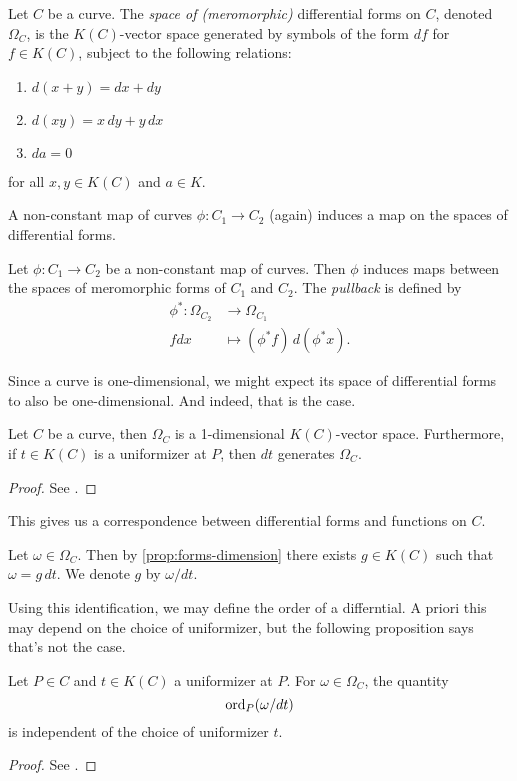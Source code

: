 \begin{definition}
	Let $C$ be a curve. 
	The \emph{space of (meromorphic)} differential forms on $C$, denoted
	$\Omega_C$, is the $K(C)$-vector space generated by symbols of the form
	$df$ for $f\in K(C)$, subject to the following relations:
	\begin{enumerate}[itemsep=0em]
		\item $d(x + y) = dx + dy$
		\item $d(xy) = x\,dy + y\,dx$
		\item $da = 0$
	\end{enumerate}
	for all $x, y \in K(C)$ and $a \in K$.
\end{definition}

A non-constant map of curves $\phi:C_1 \to C_2$ (again) induces a map
on the spaces of differential forms.

\begin{definition}
	Let $\phi: C_1 \to C_2$ be a non-constant map of curves. Then $\phi$ induces
	maps between the spaces of meromorphic forms of $C_1$ and $C_2$.
	The \emph{pullback} is defined by
	\begin{align*}
		\phi^*: \Omega_{C_2} &\to \Omega_{C_1}\\
		fdx &\mapsto (\phi^* f)\,d(\phi^* x).
	\end{align*}
\end{definition}

Since a curve is one-dimensional, we might expect its space of differential
forms to also be one-dimensional. And indeed, that is the case.

\begin{proposition}
	\label{prop:forms-dimension}
	Let $C$ be a curve, then $\Omega_C$ is a 1-dimensional $K(C)$-vector space.
	Furthermore, if $t \in K(C)$ is a uniformizer at $P$,
	then $dt$ generates $\Omega_C$.
\end{proposition}
\begin{proof}
	See \cite[II.1.4, II.4.2]{silverman}.
\end{proof}

This gives us a correspondence between differential forms and functions
on $C$.

\begin{notation}
	Let $\omega \in \Omega_C$. Then by \ref{prop:forms-dimension} there exists
	$g \in K(C)$ such that $\omega = g\,dt$. We denote $g$ by $\omega/dt$.
\end{notation}

Using this identification, we may define the order of a differntial.
A priori this may depend on the choice of uniformizer, but the following
proposition says that's not the case.
\begin{proposition}
	Let $P \in C$ and $t \in K(C)$ a uniformizer at $P$. For $\omega \in
	\Omega_C$,
	the quantity
	\begin{equation*}
		\operatorname{ord}_P(\omega/dt)
	\end{equation*}
	is independent of the choice of uniformizer $t$.
\end{proposition}
\begin{proof}
	See \cite[II.4.3(c)]{silverman}.
\end{proof}

